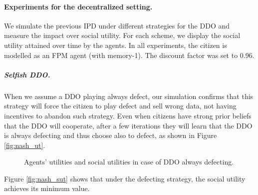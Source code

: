 \paragraph{Experiments for the decentralized setting.}

We simulate the previous IPD under different strategies 
for the DDO and measure the impact over social utility. For each scheme, we display the social utility  attained over time by the agents. In all experiments, 
the citizen is modelled as an FPM agent (with memory-1). The discount factor was set to 0.96. 

\subparagraph{Selfish DDO.} 
When we assume a DDO playing always defect, our simulation confirms that this strategy will force 
the citizen to play defect and sell wrong data, not having incentives to abandon
such strategy. 
Even when 
citizens have strong prior beliefs that the DDO will cooperate, after a
few iterations they will learn that the DDO is 
always defecting and thus choose also to defect, as shown in Figure \ref{fig:nash_ut}.

\begin{figure}[h!]
\centering
{}%
  \caption{Agents' utilities and social utilities in case of DDO always defecting.}
\end{figure}

\noindent Figure \ref{fig:nash_sut} shows that under the defecting strategy,
the social utility achieves its minimum value. 


